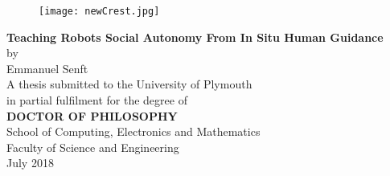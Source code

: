 \begin{center}
\begin{figure}[h]
\centering
\texttt{[image: newCrest.jpg]}
\end{figure}
\vspace{36pt}
\LARGE 
\textbf{Teaching Robots Social Autonomy From In Situ Human Guidance}
\\
\vspace{12pt}
\Large by
\\
\vspace{12pt}
\LARGE 
Emmanuel Senft
\\
\vspace{48pt}
\Large 
A thesis submitted to the University of Plymouth
\\
in partial fulfilment for the degree of
\vspace{36pt}
\\
\textbf{DOCTOR OF PHILOSOPHY}
\vspace{36pt}
\\
School of Computing, Electronics and Mathematics\\
Faculty of Science and Engineering
\vspace{36pt}
\\
\vspace{36pt}
July 2018
\end{center}

\normalsize
